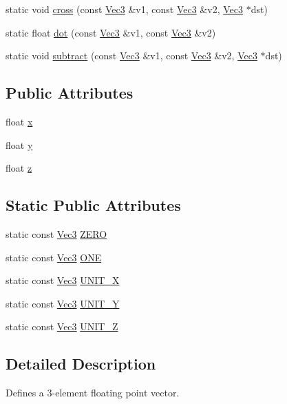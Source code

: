 \begin{DoxyCompactItemize}
\item 
static void \hyperlink{classVec3_afbbbc71f8cdfd4a600e19f9a4c6ffa5b}{cross} (const \hyperlink{classVec3}{Vec3} \&v1, const \hyperlink{classVec3}{Vec3} \&v2, \hyperlink{classVec3}{Vec3} $\ast$dst)
\item 
static float \hyperlink{classVec3_aae0b305ff841ec72ce2204a9778e9664}{dot} (const \hyperlink{classVec3}{Vec3} \&v1, const \hyperlink{classVec3}{Vec3} \&v2)
\item 
static void \hyperlink{classVec3_a1c32994616ace3938c299f7b010635c6}{subtract} (const \hyperlink{classVec3}{Vec3} \&v1, const \hyperlink{classVec3}{Vec3} \&v2, \hyperlink{classVec3}{Vec3} $\ast$dst)
\end{DoxyCompactItemize}
\subsection*{Public Attributes}
\begin{DoxyCompactItemize}
\item 
float \hyperlink{classVec3_a2814580e9b9372738c0a61197ea46b51}{x}
\item 
float \hyperlink{classVec3_abc1d241232cb04aa98217a942402ae68}{y}
\item 
float \hyperlink{classVec3_a64f3f00cd2dd9076999eeb2f05210388}{z}
\end{DoxyCompactItemize}
\subsection*{Static Public Attributes}
\begin{DoxyCompactItemize}
\item 
static const \hyperlink{classVec3}{Vec3} \hyperlink{classVec3_a26c0c52a5fba36ed0ef5e6d5026569f4}{Z\+E\+RO}
\item 
static const \hyperlink{classVec3}{Vec3} \hyperlink{classVec3_a49a4a04d8edaf8d4f5d94d661544b8a9}{O\+NE}
\item 
static const \hyperlink{classVec3}{Vec3} \hyperlink{classVec3_a859e21c0e95524033d5322f815127ff3}{U\+N\+I\+T\+\_\+X}
\item 
static const \hyperlink{classVec3}{Vec3} \hyperlink{classVec3_a0d569defe7293f1cb108f643230facf5}{U\+N\+I\+T\+\_\+Y}
\item 
static const \hyperlink{classVec3}{Vec3} \hyperlink{classVec3_a4dc6ac738e447c3f67b10d0ab5c3708b}{U\+N\+I\+T\+\_\+Z}
\end{DoxyCompactItemize}


\subsection{Detailed Description}
Defines a 3-\/element floating point vector.

